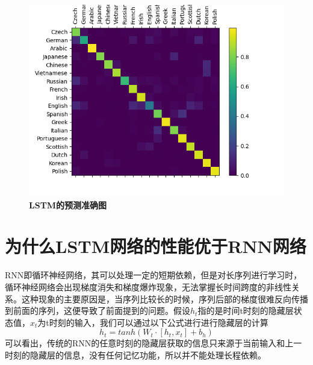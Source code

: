 \documentclass{article}
\begin{document}
\begin{figure}[H]
   \centering
   \includegraphics[scale= 0.5]{2.png}
   \caption{\textbf{LSTM的预测准确图}}
\end{figure}
\section{为什么LSTM网络的性能优于RNN网络}
RNN即循环神经网络，其可以处理一定的短期依赖，但是对长序列进行学习时，循环神经网络会出现梯度消失和梯度爆炸现象，无法掌握长时间跨度的非线性关系。这种现象的主要原因是，当序列比较长的时候，序列后部的梯度很难反向传播到前面的序列，这便导致了前面提到的问题。假设$h_t$指的是时间t时刻的隐藏层状态值，$x_t$为t时刻的输入，我们可以通过以下公式进行进行隐藏层的计算
$$
h_t = tanh(W_t\cdot [h_t, x_t] + b_h)
$$
可以看出，传统的RNN的任意时刻的隐藏层获取的信息只来源于当前输入和上一时刻的隐藏层的信息，没有任何记忆功能，所以并不能处理长程依赖。
\end{document}

